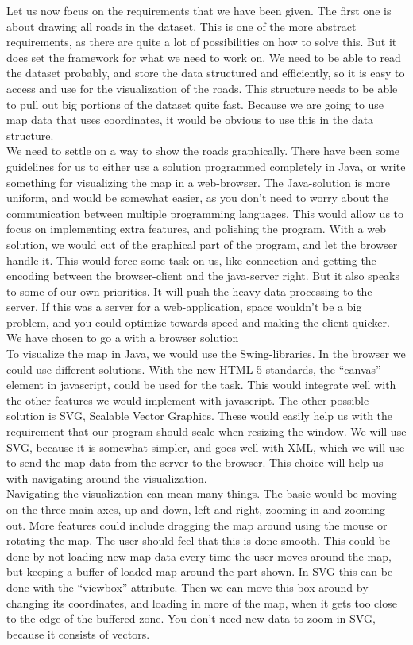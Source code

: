 \documentclass[a4paper,10pt,titlepage]{article}
\begin{document}
Let us now focus on the requirements that we have been given. The first one is about drawing all roads in the dataset. This is one of the more abstract requirements, as there are quite a lot of possibilities on how to solve this. But it does set the framework for what we need to work on. We need to be able to read the dataset probably, and store the data structured and efficiently, so it is easy to access and use for the visualization of the roads. This structure needs to be able to pull out big portions of the dataset quite fast. Because we are going to use map data that uses coordinates, it would be obvious to use this in the data structure.\\

We need to settle on a way to show the roads graphically. There have been some guidelines for us to either use a solution programmed completely in Java, or write something for visualizing the map in a web-browser. The Java-solution is more uniform, and would be somewhat easier, as you don't need to worry about the communication between multiple programming languages. This would allow us to focus on implementing extra features, and polishing the program. With a web solution, we would cut of the graphical part of the program, and let the browser handle it. This would force some task on us, like connection and getting the encoding between the browser-client and the java-server right. But it also speaks to some of our own priorities. It will push the heavy data processing to the server. If this was a server for a web-application, space wouldn't be a big problem, and you could optimize towards speed and making the client quicker. We have chosen to go a with a browser solution\\

To visualize the map in Java, we would use the Swing-libraries. In the browser we could use different solutions. With the new HTML-5 standards, the “canvas”-element in javascript, could be used for the task. This would integrate well with the other features we would implement with javascript. The other possible solution is SVG, Scalable Vector Graphics. These would easily help us with the requirement that our program should scale when resizing the window. We will use SVG, because it is somewhat simpler, and goes well with XML, which we will use to send the map data from the server to the browser. This choice will help us with navigating around the visualization.\\

Navigating the visualization can mean many things. The basic would be moving on the three main axes, up and down, left and right, zooming in and zooming out. More features could include dragging the map around using the mouse or rotating the map. The user should feel that this is done smooth. This could be done by not loading new map data every time the user moves around the map, but keeping a buffer of loaded map around the part shown. In SVG this can be done with the “viewbox”-attribute. Then we can move this box around by changing its coordinates, and loading in more of the map, when it gets too close to the edge of the buffered zone. You don’t need new data to zoom in SVG, because it consists of vectors.\\
\end{document}
